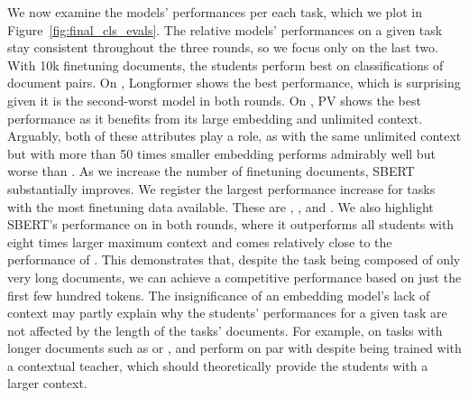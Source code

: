 We now examine the models' performances per each task, which we plot in
Figure~\ref{fig:final_cls_evals}. The relative models' performances on a
given task stay consistent throughout the three rounds, so we focus only on the
last two. With 10k finetuning documents, the students perform best on
classifications of document pairs. On , Longformer shows the best
performance, which is surprising given it is the second-worst model in both
rounds. On , PV shows the best performance as it benefits from its
large embedding and unlimited context. Arguably, both of these attributes play
a role, as  with the same unlimited context but with more than 50 times smaller embedding performs admirably well but worse than . As
we increase the number of finetuning documents, SBERT substantially improves.
We register the largest performance increase for tasks with the most
finetuning data available. These are , , and .
We also highlight SBERT's performance on  in both rounds, where it
outperforms all students with eight times larger maximum context and comes
relatively close to the performance of . This demonstrates that, despite the task being composed of only very long documents, we can achieve a
competitive performance based on just the first few hundred tokens. The insignificance of an embedding model's lack of context may
partly explain why the students' performances for a given task are not affected by the length of the tasks' documents. For example, on tasks with
longer documents such as  or , {\CosineStudent} and
{\MSEStudent} perform on par with {\OnlyMSEStudent} despite being trained with
a contextual teacher, which should theoretically provide the students with a
larger context.





